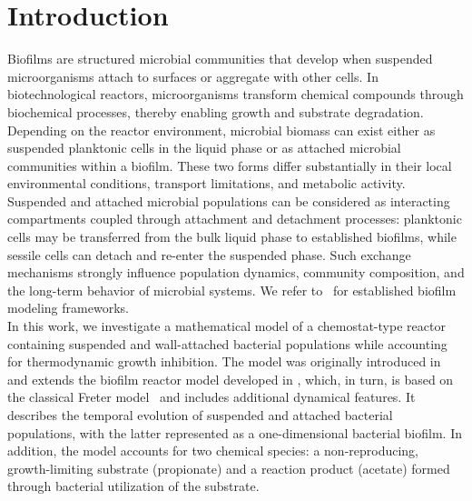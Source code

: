 \documentclass[reqno,11pt]{amsart}
\numberwithin{equation}{section}
\begin{document}
\section{Introduction}




Biofilms are structured microbial communities that develop when suspended microorganisms attach to surfaces or aggregate with other cells. In biotechnological reactors, microorganisms transform chemical compounds through biochemical processes, thereby enabling growth and substrate degradation. Depending on the reactor environment, microbial biomass can exist either as suspended planktonic cells in the liquid phase or as attached microbial communities within a biofilm. These two forms differ substantially in their local environmental conditions, transport limitations, and metabolic activity.
Suspended and attached microbial populations can be considered as interacting compartments coupled through attachment and detachment processes: planktonic cells may be transferred from the bulk liquid phase to established biofilms, while sessile cells can detach and re-enter the suspended phase. Such exchange mechanisms strongly influence population dynamics, community composition, and the long-term behavior of microbial systems. We refer to~\cite{Freter,Jones03,WannerGujer86,WannerEtAl06,KD10} for established biofilm modeling frameworks.\\

In this work, we investigate a mathematical model of a chemostat-type reactor containing suspended and wall-attached bacterial populations while accounting for thermodynamic growth inhibition. The model was originally introduced in \cite{GHE21} and extends the biofilm reactor model developed in \cite{MasicEberl12}, which, in turn, is based on the classical Freter model~\cite{Freter,Jones03,BallykJonesSmith,Stemmons} and includes additional dynamical features. It describes the temporal evolution of suspended and attached bacterial populations, with the latter represented as a one-dimensional bacterial biofilm. In addition, the model accounts for two chemical species: a non-reproducing, growth-limiting substrate (propionate) and a reaction product (acetate) formed through bacterial utilization of the substrate.\\
\end{document}
